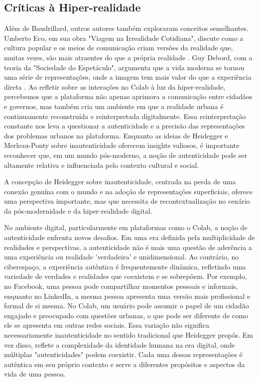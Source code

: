 \subsection*{Críticas à Hiper-realidade}

Além de Baudrillard, outros autores também exploraram conceitos semelhantes. Umberto Eco, em sua obra "Viagem na Irrealidade Cotidiana", discute como a cultura popular e os meios de comunicação criam versões da realidade que, muitas vezes, são mais atraentes do que a própria realidade \cite{1993_Eco_BOOK}. Guy Debord, com a teoria da "Sociedade do Espetáculo", argumenta que a vida moderna se tornou uma série de representações, onde a imagem tem mais valor do que a experiência direta \cite{1993_Eco_BOOK}. Ao refletir sobre as interações no Colab à luz da hiper-realidade, percebemos que a plataforma não apenas aprimora a comunicação entre cidadãos e governos, mas também cria um ambiente em que a realidade urbana é continuamente reconstruída e reinterpretada digitalmente. Essa reinterpretação constante nos leva a questionar a autenticidade e a precisão das representações dos problemas urbanos na plataforma. Enquanto as ideias de Heidegger e Merleau-Ponty sobre inautenticidade oferecem insights valiosos, é importante reconhecer que, em um mundo pós-moderno, a noção de autenticidade pode ser altamente relativa e influenciada pelo contexto cultural e social.

A concepção de Heidegger sobre inautenticidade, centrada na perda de uma conexão genuína com o mundo e na adoção de representações superficiais, oferece uma perspectiva importante, mas que necessita de recontextualização no cenário da pós-modernidade e da hiper-realidade digital. 

No ambiente digital, particularmente em plataformas como o Colab, a noção de autenticidade enfrenta novos desafios. Em uma era definida pela multiplicidade de realidades e perspectivas, a autenticidade não é mais uma questão de aderência a uma experiência ou realidade 'verdadeira' e unidimensional. Ao contrário, no ciberespaço, a experiência autêntica é frequentemente dinâmica, refletindo uma variedade de verdades e realidades que coexistem e se sobrepõem. Por exemplo, no Facebook, uma pessoa pode compartilhar momentos pessoais e informais, enquanto no LinkedIn, a mesma pessoa apresenta uma versão mais profissional e formal de si mesma. No Colab, um usuário pode assumir o papel de um cidadão engajado e preocupado com questões urbanas, o que pode ser diferente de como ele se apresenta em outras redes sociais. Essa variação não significa necessariamente inautenticidade no sentido tradicional que Heidegger propôs. Em vez disso, reflete a complexidade da identidade humana na era digital, onde múltiplas "autenticidades" podem coexistir. Cada uma dessas representações é autêntica em seu próprio contexto e serve a diferentes propósitos e aspectos da vida de uma pessoa.

